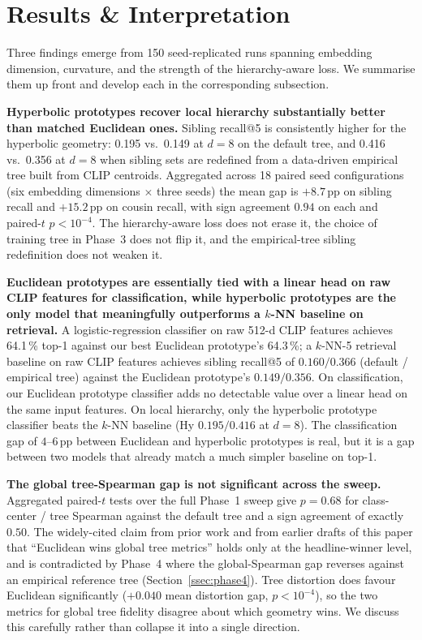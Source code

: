 \section{Results \& Interpretation}
\label{sec:results}

Three findings emerge from 150 seed-replicated runs spanning
embedding dimension, curvature, and the strength of the
hierarchy-aware loss. We summarise them up front and develop each in
the corresponding subsection.

\textbf{Hyperbolic prototypes recover local hierarchy substantially
better than matched Euclidean ones.} Sibling recall@5 is consistently
higher for the hyperbolic geometry: 0.195 vs.\ 0.149 at $d{=}8$ on
the default tree, and 0.416 vs.\ 0.356 at $d{=}8$ when sibling sets
are redefined from a data-driven empirical tree built from CLIP
centroids. Aggregated across 18 paired seed configurations (six
embedding dimensions $\times$ three seeds) the mean gap is
$+8.7$\,pp on sibling recall and $+15.2$\,pp on cousin recall, with
sign agreement $0.94$ on each and paired-$t$ $p<10^{-4}$. The
hierarchy-aware loss does not erase it, the choice of training tree
in Phase~3 does not flip it, and the empirical-tree sibling
redefinition does not weaken it.

\textbf{Euclidean prototypes are essentially tied with a linear head
on raw CLIP features for classification, while hyperbolic prototypes
are the only model that meaningfully outperforms a $k$-NN baseline
on retrieval.} A logistic-regression classifier on raw 512-d CLIP
features achieves 64.1\,\% top-1 against our best Euclidean
prototype's 64.3\,\%; a $k$-NN-5 retrieval baseline on raw CLIP
features achieves sibling recall@5 of $0.160 / 0.366$ (default /
empirical tree) against the Euclidean prototype's $0.149 / 0.356$.
On classification, our Euclidean prototype classifier adds no
detectable value over a linear head on the same input features. On
local hierarchy, only the hyperbolic prototype classifier beats the
$k$-NN baseline (Hy $0.195 / 0.416$ at $d{=}8$). The classification
gap of $4$--$6$\,pp between Euclidean and hyperbolic prototypes is
real, but it is a gap between two models that already match a much
simpler baseline on top-1.

\textbf{The global tree-Spearman gap is not significant across the
sweep.} Aggregated paired-$t$ tests over the full Phase~1 sweep give
$p=0.68$ for class-center / tree Spearman against the default tree
and a sign agreement of exactly $0.50$. The widely-cited claim from
prior work and from earlier drafts of this paper that ``Euclidean
wins global tree metrics'' holds only at the headline-winner level,
and is contradicted by Phase~4 where the global-Spearman gap reverses
against an empirical reference tree (Section~\ref{ssec:phase4}).
Tree distortion does favour Euclidean significantly ($+0.040$ mean
distortion gap, $p<10^{-4}$), so the two metrics for global tree
fidelity disagree about which geometry wins. We discuss this
carefully rather than collapse it into a single direction.

